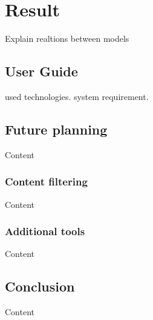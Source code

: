
\chapter{Result} %

\label{ch:result} %

Explain realtions between models

\section{User Guide}

used technologies. system requirement.


\section{Future planning}

Content


\subsection{Content filtering}

Content


\subsection{Additional tools}

Content


\section{Conclusion}

Content

